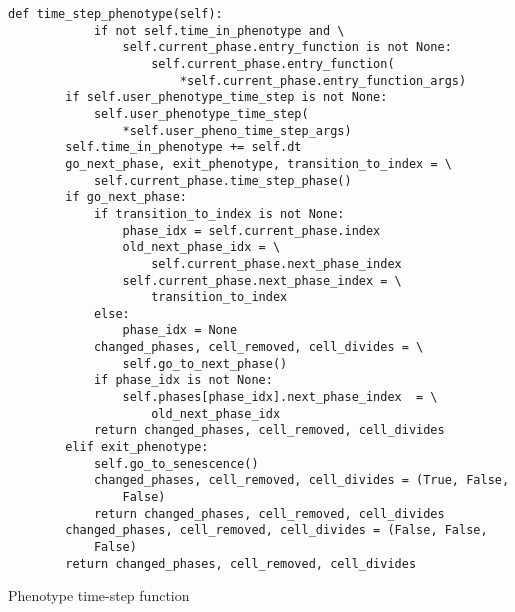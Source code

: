 \begin{listing}[!htbp]
\begin{verbatim}
def time_step_phenotype(self):
            if not self.time_in_phenotype and \
                self.current_phase.entry_function is not None:
                    self.current_phase.entry_function(
                        *self.current_phase.entry_function_args)
        if self.user_phenotype_time_step is not None:
            self.user_phenotype_time_step(
                *self.user_pheno_time_step_args)
        self.time_in_phenotype += self.dt
        go_next_phase, exit_phenotype, transition_to_index = \
            self.current_phase.time_step_phase()
        if go_next_phase:
            if transition_to_index is not None:
                phase_idx = self.current_phase.index
                old_next_phase_idx = \
                    self.current_phase.next_phase_index
                self.current_phase.next_phase_index = \
                    transition_to_index
            else:
                phase_idx = None
            changed_phases, cell_removed, cell_divides = \
                self.go_to_next_phase()
            if phase_idx is not None:
                self.phases[phase_idx].next_phase_index  = \
                    old_next_phase_idx
            return changed_phases, cell_removed, cell_divides
        elif exit_phenotype:
            self.go_to_senescence()
            changed_phases, cell_removed, cell_divides = (True, False, 
                False)
            return changed_phases, cell_removed, cell_divides
        changed_phases, cell_removed, cell_divides = (False, False, 
            False)
        return changed_phases, cell_removed, cell_divides
\end{verbatim}
\caption{Phenotype time-step function}\label{code:pheno:step}
\end{listing}




